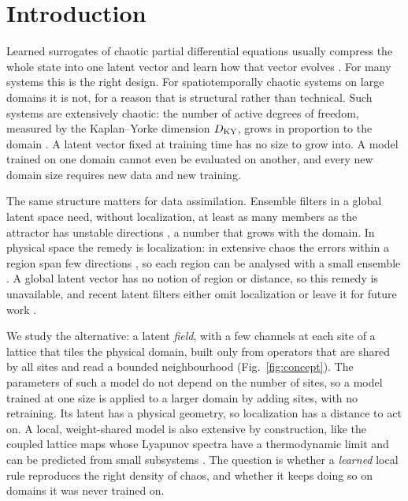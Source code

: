 \section{Introduction}
\label{sec:introduction}

Learned surrogates of chaotic partial differential equations usually
compress the whole state into one latent vector and learn how that
vector evolves \citep{linotgraham2022,racca2023,ozalpmagri2025}. For
many systems this is the right design. For spatiotemporally chaotic
systems on large domains it is not, for a reason that is structural
rather than technical. Such systems are extensively chaotic: the number
of active degrees of freedom, measured by the Kaplan--Yorke dimension
$D_{\mathrm{KY}}$, grows in proportion to the domain
\citep{ruelle1982,manneville1985,egolfgreenside1994}. A latent vector
fixed at training time has no size to grow into. A model trained on one
domain cannot even be evaluated on another, and every new domain size
requires new data and new training.

The same structure matters for data assimilation. Ensemble filters in a
global latent space need, without localization, at least as many
members as the attractor has unstable directions
\citep{bocquetcarrassi2017,takeda2026}, a number that grows with the
domain. In physical space the remedy is localization: in extensive chaos
the errors within a region span few directions
\citep{patil2001,ott2004}, so each region can be analysed with a small
ensemble \citep{hunt2007}. A global latent vector has no notion of region
or distance, so this remedy is unavailable, and recent latent filters
either omit localization or leave it for future work
\citep{chen2023roadenkf,tong2026laeenkf}.

We study the alternative: a latent \emph{field}, with a few channels at
each site of a lattice that tiles the physical domain, built only from
operators that are shared by all sites and read a bounded neighbourhood
(Fig.~\ref{fig:concept}).
The parameters of such a model do not depend on the number of sites, so
a model trained at one size is applied to a larger domain by adding
sites, with no retraining. Its latent has a physical geometry, so
localization has a distance to act on. A local, weight-shared model is
also extensive by construction, like the coupled lattice maps whose
Lyapunov spectra have a thermodynamic limit \citep{livi1986,isola1990}
and can be predicted from small subsystems \citep{carretero1999}. The
question is whether a \emph{learned} local rule reproduces the right
density of chaos, and whether it keeps doing so on domains it was never
trained on.

